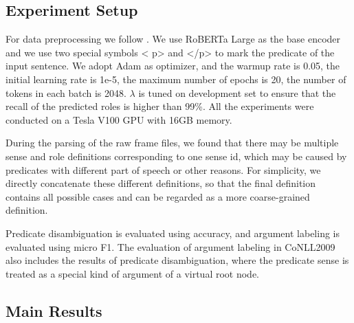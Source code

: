 \documentclass[11pt]{article}
\begin{document}
\subsection{Experiment Setup}
For data preprocessing  we follow \citep{li2019dependency}.
We use RoBERTa Large as the base encoder and we use two special symbols \textless{} p\textgreater{} and \textless{}/p\textgreater{}  to mark the predicate of the input sentence.
We adopt Adam as optimizer, and the warmup rate is 0.05, the initial learning rate is 1e-5, the maximum number of epochs is 20, the number of tokens in each batch is 2048.  $\lambda$ is tuned on development set to ensure that the recall of the predicted roles is higher than 99\%. All the experiments were conducted on a Tesla V100 GPU with 16GB memory. 
\par
During the parsing of the raw frame files, we found that there may be multiple sense and role definitions corresponding to one sense id, which may be caused by predicates with different part of speech or other reasons. For simplicity, we directly concatenate these different definitions, so that the final definition contains all possible cases and can be regarded as a more coarse-grained definition.
\par
Predicate disambiguation is evaluated using accuracy, and argument labeling is evaluated using micro F1. The evaluation of argument labeling in CoNLL2009 also includes the results of predicate disambiguation, where the predicate sense is treated as a special kind of argument of a virtual root node.


\subsection{Main Results}
\end{document}
